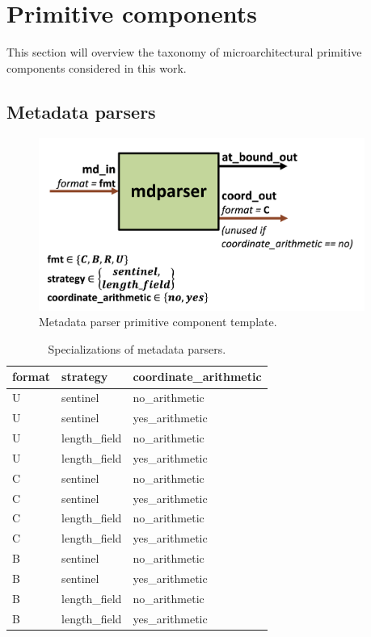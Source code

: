 \section{Primitive components}

This section will overview the taxonomy of microarchitectural primitive components considered in this work.

\subsection{Metadata parsers}

\begin{figure}[H]
    \centering
    \includegraphics[width=0.95\textwidth]{figures/mdparser.png}
    \caption{Metadata parser primitive component template.}
    \label{fig:mdparser}
\end{figure}

\begin{table}[H]
\centering
\begin{tabular}{lll}
\toprule
 format   & strategy       & coordinate\_arithmetic   \\
\midrule
 U        & sentinel & no\_arithmetic                \\
 U        & sentinel & yes\_arithmetic                 \\
 U        & length\_field & no\_arithmetic              \\
 U        & length\_field & yes\_arithmetic             \\
 C        & sentinel & no\_arithmetic                \\
 C        & sentinel & yes\_arithmetic                 \\
 C        & length\_field & no\_arithmetic              \\
 C        & length\_field & yes\_arithmetic             \\
 B        & sentinel & no\_arithmetic                  \\
 B        & sentinel & yes\_arithmetic                 \\
 B        & length\_field & no\_arithmetic              \\
 B        & length\_field & yes\_arithmetic             \\
\bottomrule
\end{tabular}
\caption{Specializations of metadata parsers.}
\label{tab:MetadataParser_specializations}
\end{table}

